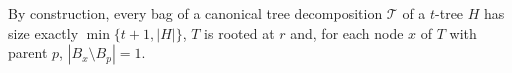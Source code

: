 \documentclass[kpfonts]{patmorin}
\theoremstyle{named}
\begin{document}
By construction, every bag of a canonical tree decomposition $\mathcal{T}$ of a $t$-tree $H$ has size exactly $\min\{t+1,|H|\}$, $T$ is rooted at $r$ and, for each node $x$ of $T$ with parent $p$, $|B_x\setminus B_p|=1$.

%
%
%
%
\end{document}
